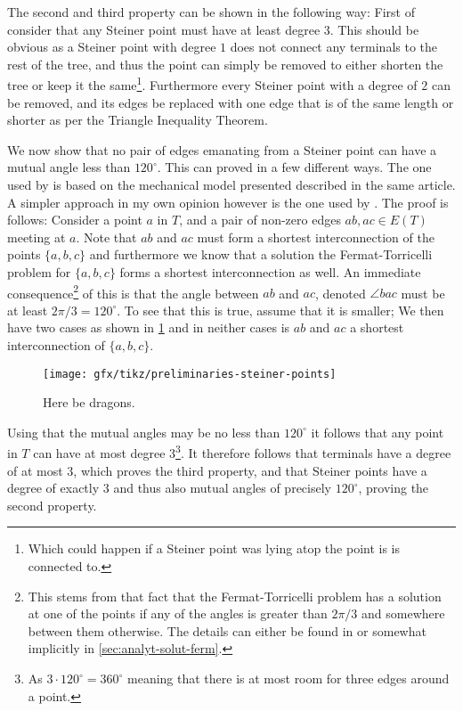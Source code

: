 The second and third property can be shown in the following way: First of consider that
any Steiner point must have at least degree $3$. This should be obvious as a
Steiner point with degree $1$ does not connect any terminals to the rest of the
tree, and thus the point can simply be removed to either shorten the tree or
keep it the same\footnote{Which could happen if a Steiner point was lying atop
  the point is is connected to.}. Furthermore every Steiner point with a degree
of $2$ can be removed, and its edges be replaced with one edge that is of the
same length or shorter as per the Triangle Inequality
Theorem\cite{triangleinequality}.

We now show that no pair of edges emanating from a Steiner point can have a
mutual angle less than $120^{\circ}$. This can proved in a few different
ways. The one used by \textcite{gilbert1968} is based on the mechanical model
presented described in the same article. A simpler approach in my own opinion
however is the one used by \textcite{brazil2015}. The proof is follows: Consider
a point $a$ in $T$, and a pair of non-zero edges $ab, ac \in E(T)$ meeting at
$a$. Note that $ab$ and $ac$ must form a shortest interconnection of the points
$\{a, b, c\}$ and furthermore we know that a solution the Fermat-Torricelli
problem for $\{ a, b, c \}$ forms a shortest interconnection as well. An
immediate consequence\footnote{This stems from that fact that the
  Fermat-Torricelli problem has a solution at one of the points if any of the
  angles is greater than $2 \pi / 3$ and somewhere between them otherwise. The
  details can either be found in \textcite[ch.~1]{brazil2015} or somewhat
  implicitly in \cref{sec:analyt-solut-ferm}.} of this is that the angle between
$ab$ and $ac$, denoted $\angle bac$ must be at least $2 \pi / 3 = 120^{\circ}$.
To see that this is true, assume that it is smaller; We then have two cases as
shown in \cref{fig:preliminaries-steiner-point} and in neither cases is $ab$ and
$ac$ a shortest interconnection of $\{a, b, c\}$.
%
\begin{figure}[htbp]
\centering
\texttt{[image: gfx/tikz/preliminaries-steiner-points]}
\caption[Here be dragons.]{Here be dragons.\label{fig:preliminaries-steiner-point}}
\end{figure}
%
Using that the mutual angles may be no less than $120^{\circ}$ it follows that
any point in $T$ can have at most degree $3$\footnote{As
$3 \cdot 120^{\circ} = 360^{\circ}$ meaning that there is at most room for three
edges around a point.}. It therefore follows that terminals have a degree of at
most $3$, which proves the third property, and that Steiner points have a
degree of exactly $3$ and thus also mutual angles of precisely $120^{\circ}$,
proving the second property.

